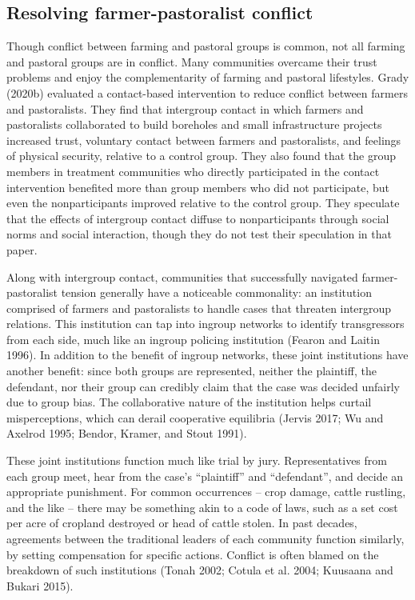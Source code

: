 \documentclass[11pt]{article}
\begin{document}
\hypertarget{resolving-farmer-pastoralist-conflict}{%
\subsection{Resolving farmer-pastoralist
conflict}\label{resolving-farmer-pastoralist-conflict}}

Though conflict between farming and pastoral groups is common, not all
farming and pastoral groups are in conflict. Many communities overcame
their trust problems and enjoy the complementarity of farming and
pastoral lifestyles. Grady (2020b) evaluated a contact-based
intervention to reduce conflict between farmers and pastoralists. They
find that intergroup contact in which farmers and pastoralists
collaborated to build boreholes and small infrastructure projects
increased trust, voluntary contact between farmers and pastoralists, and
feelings of physical security, relative to a control group. They also
found that the group members in treatment communities who directly
participated in the contact intervention benefited more than group
members who did not participate, but even the nonparticipants improved
relative to the control group. They speculate that the effects of
intergroup contact diffuse to nonparticipants through social norms and
social interaction, though they do not test their speculation in that
paper.

Along with intergroup contact, communities that successfully navigated
farmer-pastoralist tension generally have a noticeable commonality: an
institution comprised of farmers and pastoralists to handle cases that
threaten intergroup relations. This institution can tap into ingroup
networks to identify transgressors from each side, much like an ingroup
policing institution (Fearon and Laitin 1996). In addition to the
benefit of ingroup networks, these joint institutions have another
benefit: since both groups are represented, neither the plaintiff, the
defendant, nor their group can credibly claim that the case was decided
unfairly due to group bias. The collaborative nature of the institution
helps curtail misperceptions, which can derail cooperative equilibria
(Jervis 2017; Wu and Axelrod 1995; Bendor, Kramer, and Stout 1991).

These joint institutions function much like trial by jury.
Representatives from each group meet, hear from the case's ``plaintiff''
and ``defendant'', and decide an appropriate punishment. For common
occurrences -- crop damage, cattle rustling, and the like -- there may
be something akin to a code of laws, such as a set cost per acre of
cropland destroyed or head of cattle stolen. In past decades, agreements
between the traditional leaders of each community function similarly, by
setting compensation for specific actions. Conflict is often blamed on
the breakdown of such institutions (Tonah 2002; Cotula et al. 2004;
Kuusaana and Bukari 2015).
\end{document}
